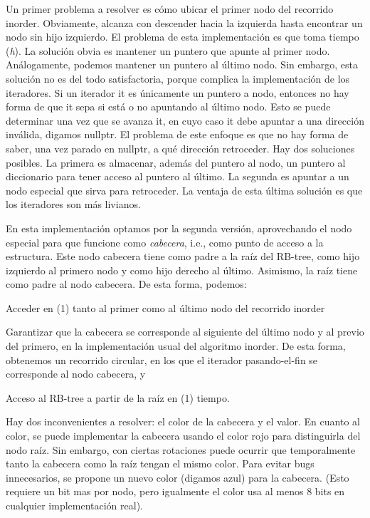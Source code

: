 Un primer problema a resolver es cómo ubicar el primer nodo del recorrido inorder. Obviamente, alcanza con descender hacia la izquierda hasta encontrar un nodo sin hijo izquierdo. El problema de esta implementación es que toma tiempo ({\itshape h}). La solución obvia es mantener un puntero que apunte al primer nodo. Análogamente, podemos mantener un puntero al último nodo. Sin embargo, esta solución no es del todo satisfactoria, porque complica la implementación de los iteradores. Si un iterador {\ttfamily it} es únicamente un puntero a nodo, entonces no hay forma de que {\ttfamily it} sepa si está o no apuntando al último nodo. Esto se puede determinar una vez que se avanza {\ttfamily it}, en cuyo caso {\ttfamily it} debe apuntar a una dirección inválida, digamos {\ttfamily nullptr}. El problema de este enfoque es que no hay forma de saber, una vez parado en {\ttfamily nullptr}, a qué dirección retroceder. Hay dos soluciones posibles. La primera es almacenar, además del puntero al nodo, un puntero al diccionario para tener acceso al puntero al último. La segunda es apuntar a un nodo especial que sirva para retroceder. La ventaja de esta última solución es que los iteradores son más livianos.

En esta implementación optamos por la segunda versión, aprovechando el nodo especial para que funcione como {\itshape cabecera}, i.\+e., como punto de acceso a la estructura. Este nodo cabecera tiene como padre a la raíz del R\+B-\/tree, como hijo izquierdo al primero nodo y como hijo derecho al último. Asimismo, la raíz tiene como padre al nodo cabecera. De esta forma, podemos\+:
\begin{DoxyEnumerate}
\item Acceder en (1) tanto al primer como al último nodo del recorrido inorder
\item Garantizar que la cabecera se corresponde al siguiente del último nodo y al previo del primero, en la implementación usual del algoritmo inorder. De esta forma, obtenemos un recorrido circular, en los que el iterador pasando-\/el-\/fin se corresponde al nodo cabecera, y
\item Acceso al R\+B-\/tree a partir de la raíz en (1) tiempo.
\end{DoxyEnumerate}

Hay dos inconvenientes a resolver\+: el color de la cabecera y el valor. En cuanto al color, se puede implementar la cabecera usando el color rojo para distinguirla del nodo raíz. Sin embargo, con ciertas rotaciones puede ocurrir que temporalmente tanto la cabecera como la raíz tengan el mismo color. Para evitar bugs innecesarios, se propone un nuevo color (digamos azul) para la cabecera. (Esto requiere un bit mas por nodo, pero igualmente el color usa al menos 8 bits en cualquier implementación real).

